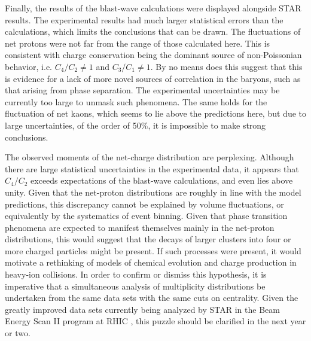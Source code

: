 Finally, the results of the blast-wave calculations were displayed alongside STAR results. The experimental results had much larger statistical errors than the calculations, which limits the conclusions that can be drawn. The fluctuations of net protons were not far from the range of those calculated here. This is consistent with charge conservation being the dominant source of non-Poissonian behavior, i.e. $C_4/C_2\ne 1$ and $C_3/C_1\ne 1$. By no means does this suggest that this is evidence for a lack of more novel sources of correlation in the baryons, such as that arising from phase separation. The experimental uncertainties may be  currently too large to unmask such phenomena. The same holds for the fluctuation of net kaons, which seems to lie above the predictions here, but due to large uncertainties, of the order of 50\%, it is impossible to make strong conclusions.

The observed moments of the net-charge distribution are perplexing. Although there are large statistical uncertainties in the experimental data, it appears that $C_4/C_2$ exceeds expectations of the blast-wave calculations, and even lies above unity. Given that the net-proton distributions are roughly in line with the model predictions, this discrepancy cannot be explained by volume fluctuations, or equivalently by the systematics of event binning. Given that phase transition phenomena are expected to manifest themselves mainly in the net-proton distributions, this would suggest that the decays of larger clusters into four or more charged particles might be present. If such processes were present, it would motivate a rethinking of models of chemical evolution and charge production in heavy-ion collisions. In order to confirm or dismiss this hypothesis, it is imperative that a simultaneous analysis of multiplicity distributions be undertaken from the same data sets with the same cuts on centrality. Given the greatly improved data sets currently being analyzed by STAR in the Beam Energy Scan II program at RHIC \cite{Yang:2017llt}, this puzzle should be clarified in the next year or two.

